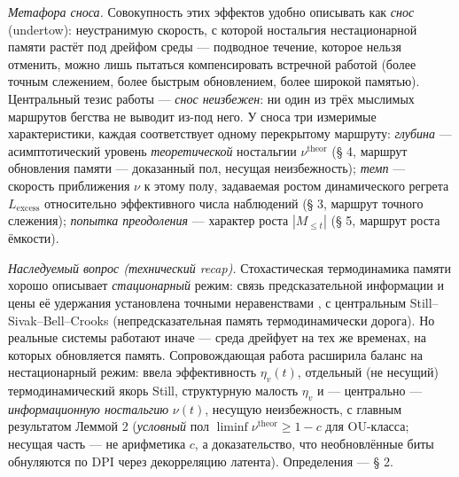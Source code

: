 \documentclass[12pt]{iopart}
\begin{document}
\emph{Метафора сноса.} Совокупность этих эффектов удобно описывать как \emph{снос} (undertow): неустранимую скорость, с которой ностальгия нестационарной памяти растёт под дрейфом среды --- подводное течение, которое нельзя отменить, можно лишь пытаться компенсировать встречной работой (более точным слежением, более быстрым обновлением, более широкой памятью). Центральный тезис работы --- \emph{снос неизбежен}: ни один из трёх мыслимых маршрутов бегства не выводит из-под него. У сноса три измеримые характеристики, каждая соответствует одному перекрытому маршруту: \emph{глубина} --- асимптотический уровень \emph{теоретической} ностальгии \(\nu^{\text{theor}}\) (§ 4, маршрут обновления памяти --- доказанный пол, несущая неизбежность); \emph{темп} --- скорость приближения \(\nu\) к этому полу, задаваемая ростом динамического регрета \(L_{\text{excess}}\) относительно эффективного числа наблюдений (§ 3, маршрут точного слежения); \emph{попытка преодоления} --- характер роста \(|M_{\le t}|\) (§ 5, маршрут роста ёмкости).



\emph{Наследуемый вопрос (технический recap).} Стохастическая термодинамика памяти хорошо описывает \emph{стационарный} режим: связь предсказательной информации \cite{BialekNemenmanTishby2001,CrutchfieldFeldman2003} и цены её удержания установлена точными неравенствами \cite{Still2012,SagawaUeda2009,Seifert2012}, с центральным Still--Sivak--Bell--Crooks \cite{Still2012} (непредсказательная память термодинамически дорога). Но реальные системы работают иначе --- среда дрейфует на тех же временах, на которых обновляется память. Сопровождающая работа \cite{Andriishin2026b} расширила баланс на нестационарный режим: ввела эффективность \(\eta_v(t)\), отдельный (не несущий) термодинамический якорь Still, структурную малость \(\eta_v\) и --- центрально --- \emph{информационную ностальгию} \(\nu(t)\), несущую неизбежность, с главным результатом Леммой 2 (\emph{условный} пол \(\liminf\nu^{\text{theor}} \ge 1-c\) для OU-класса; несущая часть --- не арифметика \(c\), а доказательство, что необновлённые биты обнуляются по DPI через декорреляцию латента). Определения --- § 2.
\end{document}
